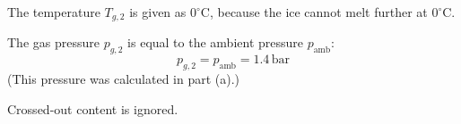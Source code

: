 The temperature \( T_{g,2} \) is given as \( 0^\circ\text{C} \), because the ice cannot melt further at \( 0^\circ\text{C} \).  

The gas pressure \( p_{g,2} \) is equal to the ambient pressure \( p_{\text{amb}} \):  
\[
p_{g,2} = p_{\text{amb}} = 1.4 \, \text{bar}
\]
(This pressure was calculated in part (a).)  

Crossed-out content is ignored.